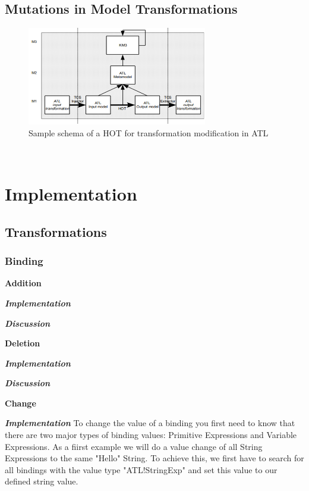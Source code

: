\documentclass{llncs}
\begin{document}
\subsection{Mutations in Model Transformations}

\begin{figure}[tb]
	\centering
	\includegraphics[width=0.7\textwidth,natwidth=610,natheight=642]{figures/HOT.png}
	\caption{Sample schema of a HOT for transformation modification in ATL}
	\label{fig:samplefigure_pdf}
\end{figure}~\cite{misc:ModelingLanguages}

\section{Implementation}

\subsection{Transformations}

\subsubsection{Binding}

\textbf{Addition}

\textbf\textit{{Implementation}}

\textbf\textit{{Discussion}}

\textbf{Deletion}

\textbf\textit{{Implementation}}

\textbf\textit{{Discussion}}

\textbf{Change}

\textbf\textit{{Implementation}}
To change the value of a binding you first need to know that there are two major types of binding values: Primitive Expressions and Variable Expressions.
As a fiirst example we will do a value change of all String Expressions to the same "Hello" String.
To achieve this, we first have to search for all bindings with the value type "ATL!StringExp" and set this value to our defined string value.
\end{document}
